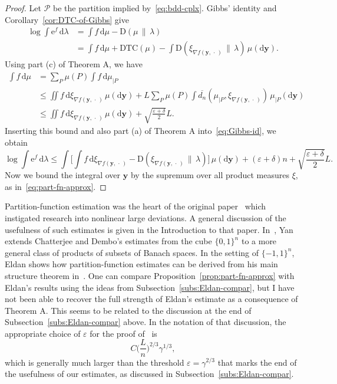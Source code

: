 \documentclass[aop,preprint]{imsart}
\theoremstyle{remark}
\renewcommand{\bf}[1]{\boldsymbol{#1}}
\renewcommand{\cal}[1]{\mathcal{#1}}
\renewcommand{\d}{\mathrm{d}}
\newcommand{\rme}{\mathrm{e}}
\newcommand{\eps}{\varepsilon}
\newcommand{\g}{\gamma}
\renewcommand{\l}{\lambda}
\newcommand{\ol}[1]{\overline{#1}}
\newcommand{\DTC}{\mathrm{DTC}}
\newcommand{\rmD}{\mathrm{D}}
\begin{document}
\begin{proof}
	Let $\cal{P}$ be the partition implied by~\eqref{eq:bdd-cplx}.  Gibbs' identity and Corollary~\ref{cor:DTC-of-Gibbs} give
	\begin{align}\label{eq:Gibbs-id}
\log \int \rme^f\,\d\l &= \int f\,\d\mu - \rmD(\mu\,\|\,\l) \nonumber \\
&= \int f\,\d\mu + \DTC(\mu) - \int \rmD(\xi_{\nabla f(\bf{y},\,\cdot\,)}\,\|\,\l)\,\mu(\d\bf{y}).
\end{align}
	Using part (c) of Theorem A, we have
	\begin{align}\label{eq:ints-diff}
	\int f\,\d\mu &= \sum_P\mu(P)\int f\,\d\mu_{|P} \nonumber\\
	&\leq \iint f\,\d\xi_{\nabla f(\bf{y},\,\cdot\,)}\,\mu(\d\bf{y}) + L\sum_P\mu(P) \int \ol{d_n}(\mu_{|P},\xi_{\nabla f(\bf{y},\,\cdot\,)})\,\mu_{|P}(\d\bf{y}) \nonumber\\
	&\leq \iint f\,\d\xi_{\nabla f(\bf{y},\,\cdot\,)}\,\mu(\d\bf{y}) + \sqrt{\frac{\eps + \delta}{2}}L.
	\end{align}
Inserting this bound and also part (a) of Theorem A into~\eqref{eq:Gibbs-id}, we obtain
\[\log\int \rme^f\,\d\l \leq \int\Big[\int f\,\d\xi_{\nabla f(\bf{y},\,\cdot\,)} - \rmD(\xi_{\nabla f(\bf{y},\,\cdot\,)}\,\|\,\l)\Big]\,\mu(\d\bf{y}) + (\eps + \delta)n + \sqrt{\frac{\eps + \delta}{2}}L.\]
Now we bound the integral over $\bf{y}$ by the supremum over all product measures $\xi$, as in~\eqref{eq:part-fn-approx}.
	\end{proof}

Partition-function estimation was the heart of the original paper~\cite{ChaDem16} which instigated research into nonlinear large deviations.  A general discussion of the usefulness of such estimates is given in the Introduction to that paper.  In~\cite{Yan--nldp}, Yan extends Chatterjee and Dembo's estimates from the cube $\{0,1\}^n$ to a more general class of products of subsets of Banach spaces.  In the setting of $\{-1,1\}^n$, Eldan shows how partition-function estimates can be derived from his main structure theorem in~\cite[Corollary 2]{Eld--GWcomp}.  One can compare Proposition~\ref{prop:part-fn-approx} with Eldan's results using the ideas from Subsection~\ref{subs:Eldan-compar}, but I have not been able to recover the full strength of Eldan's estimate as a consequence of Theorem A.  This seems to be related to the discussion at the end of Subsection~\ref{subs:Eldan-compar} above.  In the notation of that discussion, the appropriate choice of $\eps$ for the proof of~\cite[Corollary 2]{Eld--GWcomp} is
\[C\Big(\frac{L}{n}\Big)^{2/3}\g^{1/3},\]
which is generally much larger than the threshold $\eps = \g^{2/3}$ that marks the end of the usefulness of our estimates, as discussed in Subsection~\ref{subs:Eldan-compar}.
\end{document}
